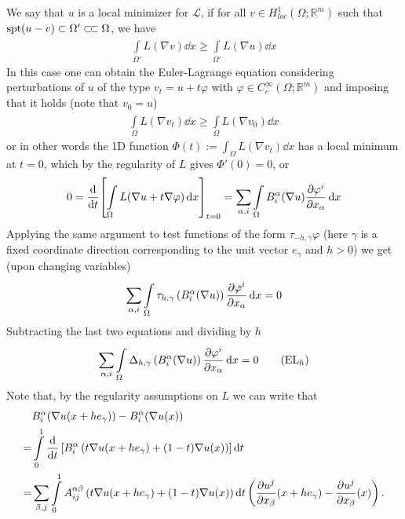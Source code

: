 We say that \( u \) is a local minimizer for \( \mathcal{L} \), if for all \( v \in  H_{loc}^{1}(\Omega ; \mathbb{R}^{m})  \) such that \( \operatorname{spt}(u-v) \subset \Omega' \ssubset \Omega  \), we have
\begin{gather}
	\int\limits_{\Omega'}^{} L(\nabla v)  \dd{x}	\geq \int\limits_{\Omega'}^{} L(\nabla u)  \dd{x}
\end{gather}
In this case one can obtain the Euler-Lagrange equation considering perturbations of \( u \) of the type \( v_{t}= u +t \varphi  \) with \(  \varphi \in C_{c}^{\infty }(\Omega ; \mathbb{R}^{m})  \) and imposing that it holds (note that \( v_{0}=u \))
\begin{gather}
	\int\limits_{\Omega}^{} L(\nabla v_{t})  \dd{x} \geq \int\limits_{\Omega}^{} L(\nabla v_{0})  \dd{x}
\end{gather}
or in other words the 1D function \( \Phi (t):= \int_{\Omega}^{} L(\nabla v_{t})  \dd{x}  \) has a local minimum at \( t=0 \), which by the regularity of \( L \) gives \( \Phi '(0)=0  \), or
\begin{gather}
	0 = \odv[]{}{t}{\left[ \int\limits_{\Omega}^{} L(\nabla u + t \nabla \varphi )  \dd{x} \right]}_{t=0} = \sum\limits_{\alpha , i}^{} \int\limits_{\Omega}^{} B_{i}^{\alpha }(\nabla u) \pdv[]{\varphi^{i}}{x_{\alpha }} \dd{x}
\end{gather}
Applying the same argument to test functions of the form \( \tau _{-h, \gamma }\varphi  \) (here \( \gamma  \) is a fixed coordinate direction corresponding to the unit vector \( e_{\gamma } \) and \( h>0 \)) we get (upon changing variables)
\begin{gather}
	\sum\limits_{\alpha , i}^{} \int\limits_{\Omega}^{} \tau _{h, \gamma } \left( B_{i}^{\alpha }(\nabla u) \right) \pdv[]{\varphi^{i}}{x_{\alpha }} \mathop{}\!\mathrm{d}x = 0
\end{gather}
Subtracting the last two equations and dividing by \( h \)
\begin{gather}
	\sum\limits_{\alpha , i}^{} \int\limits_{\Omega}^{} \Delta _{h, \gamma } \left( B_{i}^{\alpha }(\nabla u)  \right) \pdv[]{\varphi ^{i}}{x_{\alpha }} \dd{x}	=0   \tag{EL\(_{h} \)}\label{ELh}
\end{gather}
Note that, by the regularity assumptions on \( L \) we can write that
\begin{align}
	  & B_{i}^{\alpha } (\nabla u(x+h e_{\gamma }) ) -  B_{i}^{\alpha } (\nabla u(x) )  \\
	= & \int\limits_{0}^{1} \odv[]{}{t} \left[ B_{i}^{\alpha } \left( t\nabla u(x+h e_{\gamma }) +(1-t) \nabla u(x) \right)  \right] \dd{t}  \\
	= & \sum\limits_{\beta , j}^{} \int\limits_{0}^{1} A_{ij}^{\alpha \beta } \left( t\nabla u(x+h e_{\gamma }) +(1-t) \nabla u(x) \right) \dd{t} \left( \pdv[]{u^{j}}{x_{\beta }}(x+h e_{\gamma }) - \pdv[]{u^{j}}{x_{\beta }}(x)  \right).
\end{align}
